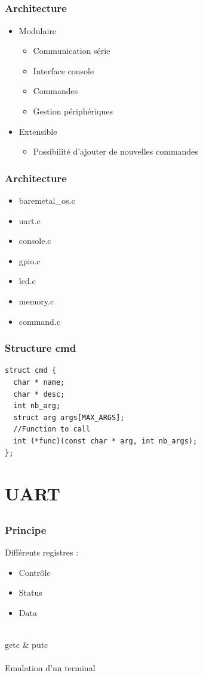 \documentclass{beamer}
\begin{document}
\subsection{ }

\begin{frame}
\frametitle{Architecture}
\begin{itemize}
\item Modulaire
    \begin{itemize}
	\item Communication série
	\item Interface console
	\item Commandes
	\item Gestion périphériques
    \end{itemize}
\item Extensible
    \begin{itemize}
	\item Possibilité d'ajouter de nouvelles commandes
    \end{itemize}
\end{itemize}
\end{frame}

\begin{frame}
\frametitle{Architecture}
\begin{itemize}
\item baremetal\_os.c
\item uart.c
\item console.c
\item gpio.c
\item led.c
\item memory.c
\item command.c
\end{itemize}
\end{frame}

\begin{frame}[fragile]
\frametitle{Structure cmd}
\begin{lstlisting}
struct cmd {
  char * name;
  char * desc;
  int nb_arg;
  struct arg args[MAX_ARGS];
  //Function to call
  int (*func)(const char * arg, int nb_args);
};
\end{lstlisting}
\end{frame}

\section{UART}
\subsection{}
\begin{frame}
  \frametitle{Principe}
  Différents registres :
  \begin{itemize}
    \item Contrôle
    \item Status
    \item Data
  \end{itemize}~\\
  \textsf{getc} \& \textsf{putc} \\~\\
  Emulation d'un terminal
\end{frame}
\end{document}
